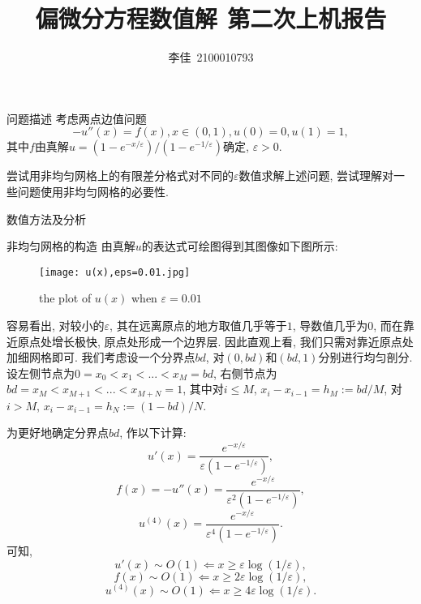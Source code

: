 \documentclass{article}
\title{偏微分方程数值解$\ \ $第二次上机报告}
\author{李佳~2100010793}
\date{}
\begin{document}
\maketitle
\begin{section}{问题描述}
    考虑两点边值问题$$-u''(x)=f(x),x\in(0,1),u(0)=0,u(1)=1,$$
    其中$f$由真解$u=(1-e^{-x/\varepsilon})/(1-e^{-1/\varepsilon})$确定, $\varepsilon>0$.

    尝试用非均匀网格上的有限差分格式对不同的$\varepsilon$数值求解上述问题, 尝试理解对一些问题使用非均匀网格的必要性.
\end{section}
\begin{section}{数值方法及分析}
    \begin{subsection}{非均匀网格的构造}
        由真解$u$的表达式可绘图得到其图像如下图所示:
        \begin{figure}[!htbp]
            \centering
            \texttt{[image: u(x),eps=0.01.jpg]}
            \caption{the plot of $u(x)$ when $\varepsilon=0.01$}
        \end{figure}
        
        容易看出, 对较小的$\varepsilon$, 其在远离原点的地方取值几乎等于$1$, 导数值几乎为0, 而在靠近原点处增长极快, 原点处形成一个边界层. 
        因此直观上看, 我们只需对靠近原点处加细网格即可. 我们考虑设一个分界点$bd$, 对$(0,bd)$和$(bd,1)$分别进行均匀剖分. 设左侧节点为$0=x_0<x_1<...<x_M=bd$, 
        右侧节点为$bd=x_M<x_{M+1}<...<x_{M+N}=1$, 其中对$i\leq M$, $x_{i}-x_{i-1}=h_M:=bd/M$, 对$i>M$, $x_i-x_{i-1}=h_N:=(1-bd)/N$.
        
        为更好地确定分界点$bd$, 作以下计算:
        $$u'(x) = \frac{e^{-x/\varepsilon}}{\varepsilon(1-e^{-1/\varepsilon})},$$
        $$f(x)=-u''(x) = \frac{e^{-x/\varepsilon}}{\varepsilon^2(1-e^{-1/\varepsilon})},$$
        $$u^{(4)}(x) = \frac{e^{-x/\varepsilon}}{\varepsilon^4(1-e^{-1/\varepsilon})}.$$
        可知, $$u'(x)\sim O(1)\Leftarrow x\geq \varepsilon\log(1/\varepsilon),$$
        $$f(x)\sim O(1)\Leftarrow x\geq 2\varepsilon\log(1/\varepsilon),$$
        $$u^{(4)}(x)\sim O(1)\Leftarrow x\geq 4\varepsilon\log(1/\varepsilon).$$


\end{subsection}
\end{section}
\end{document}
